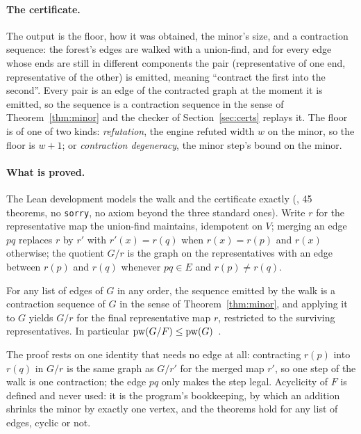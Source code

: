 \paragraph{The certificate.} The output is the floor, how it was obtained,
the minor's size, and a contraction sequence: the forest's edges are walked
with a union-find, and for every edge whose ends are still in different
components the pair (representative of one end, representative of the other)
is emitted, meaning ``contract the first into the second''. Every pair is an
edge of the contracted graph at the moment it is emitted, so the sequence is
a contraction sequence in the sense of Theorem~\ref{thm:minor} and the
checker of Section~\ref{sec:certs} replays it. The floor is of one of two
kinds: \emph{refutation}, the engine refuted width $w$ on the minor, so the
floor is $w+1$; or \emph{contraction degeneracy}, the minor step's bound on
the minor.

\paragraph{What is proved.} The Lean development models the walk and the
certificate exactly (, 45 theorems, no
\texttt{sorry}, no axiom beyond the three standard ones). Write $r$ for the
representative map the union-find maintains, idempotent on $V$; merging an
edge $pq$ replaces $r$ by $r'$ with $r'(x)=r(q)$ when $r(x)=r(p)$ and $r(x)$
otherwise; the quotient $G/r$ is the graph on the representatives with an
edge between $r(p)$ and $r(q)$ whenever $pq\in E$ and $r(p)\neq r(q)$.

\begin{theorem}\label{thm:tabu-seq}
For any list of edges of $G$ in any order, the sequence emitted by the walk
is a contraction sequence of $G$ in the sense of Theorem~\ref{thm:minor},
and applying it to $G$ yields $G/r$ for the final representative map $r$,
restricted to the surviving representatives. In particular
$\mathrm{pw}(G/F)\le\mathrm{pw}(G)$~.
\end{theorem}

The proof rests on one identity that needs no edge at all: contracting
$r(p)$ into $r(q)$ in $G/r$ is the same graph as $G/r'$ for the merged map
$r'$, so one step of the walk is one contraction; the edge $pq$ only makes
the step legal. Acyclicity of $F$ is defined and never used: it is the
program's bookkeeping, by which an addition shrinks the minor by exactly one
vertex, and the theorems hold for any list of edges, cyclic or not.

